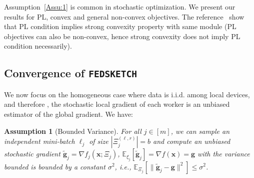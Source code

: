 \documentclass{article}
\newtheorem{assumption}{Assumption}
\begin{document}
Assumption~\ref{Assu:1} is common in stochastic optimization. 
We present our results for PL, convex and general non-convex objectives. The reference~\citet{karimi2016linear} show that PL condition implies strong convexity property with same module (PL objectives can also be non-convex, hence strong convexity does not imply PL condition necessarily).

\vspace{-0.05in}
\subsection{Convergence of  \texttt{FEDSKETCH} } 
\vspace{-0.05in}
We now focus on the homogeneous case where data is i.i.d. among local devices, and therefore 
, the stochastic local gradient of each worker is an unbiased estimator of the global gradient.
We have:
\begin{assumption}[Bounded Variance]\label{Assu:1.5}
For all $j\in [m]$, we can sample an independent mini-batch $\ell_j$   of size $|\Xi_j^{(\ell,r)}| = b$ and compute an unbiased stochastic gradient  $\tilde{\mathbf{g}}_j = \nabla f_j(\boldsymbol{x}; \Xi_j)$, $\mathbb{E}_{\xi_j}[\tilde{\mathbf{g}}_j] = \nabla f(\boldsymbol{x})=\mathbf{g}$ with  the variance bounded is bounded by a constant $\sigma^2$, i.e., $
\mathbb{E}_{\Xi_j}\left[\|\tilde{\mathbf{g}}_j-\mathbf{g}\|^2\right]\leq \sigma^2$.
\end{assumption}
\end{document}
